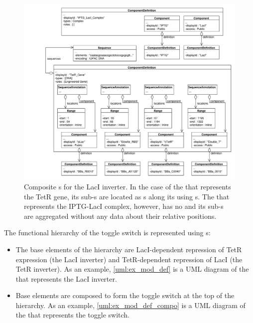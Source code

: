 \begin{figure}[ht]
\begin{center}
\includegraphics[width=\textwidth]{example_uml/toggle_2}
\caption[]{Composite s for the LacI inverter. In the case of the  that represents the TetR gene, its sub-s are located as s along its  using s. The  that represents the IPTG-LacI complex, however, has no  and its sub-s are aggregated without any data about their relative positions.}
\label{uml:ex_comp_def_compo}
\end{center}
\end{figure}

The functional hierarchy of the toggle switch is represented using
s:
\begin{itemize}
\item The base elements of the hierarchy are LacI-dependent repression of TetR expression (the LacI inverter) and TetR-dependent repression of LacI (the TetR inverter). As an example, \ref{uml:ex_mod_def} is a UML diagram of the  that represents the LacI inverter.
\item Base elements are composed to form the toggle switch at the top of the hierarchy.  As an example, \ref{uml:ex_mod_def_compo} is a UML diagram of the  that represents the toggle switch.
\end{itemize}

